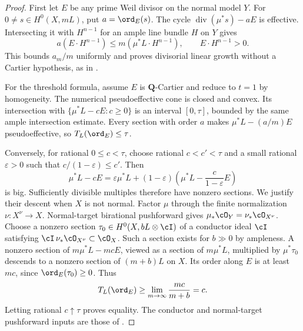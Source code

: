\begin{proof}
First let $E$ be any prime Weil divisor on the normal model $Y$.
For $0\ne s\in H^0(X,mL)$, put $a=\ord_E(s)$.  The cycle
$\operatorname{div}(\mu^*s)-aE$ is effective.  Intersecting it with
$H^{n-1}$ for an ample line bundle $H$ on $Y$ gives
\[
 a(E\cdot H^{n-1})\le m(\mu^*L\cdot H^{n-1}),
 \qquad E\cdot H^{n-1}>0.
\]
This bounds $a_m/m$ uniformly and proves divisorial linear growth
without a Cartier hypothesis, as in \cite[Proposition~1.28]{BJ22}.

For the threshold formula, assume $E$ is $\mathbf Q$-Cartier and
reduce to $t=1$ by homogeneity.  The numerical pseudoeffective cone
is closed and convex.  Its intersection with
$\{\mu^*L-cE:c\ge0\}$ is an interval $[0,\tau]$, bounded by the
same ample intersection estimate.  Every section with order $a$
makes $\mu^*L-(a/m)E$ pseudoeffective, so $T_L(\ord_E)\le\tau$.

Conversely, for rational $0\le c<\tau$, choose rational
$c<c'<\tau$ and a small rational $\varepsilon>0$ such that
$c/(1-\varepsilon)\le c'$.  Then
\[
 \mu^*L-cE=\varepsilon\mu^*L+
 (1-\varepsilon)\left(\mu^*L-\frac{c}{1-\varepsilon}E\right)
\]
is big.  Sufficiently divisible multiples therefore have nonzero
sections.  We justify their descent when $X$ is not normal.
Factor $\mu$ through the finite normalization $\nu:X^\nu\to X$.
Normal-target birational pushforward gives
$\mu_*\cO_Y=\nu_*\cO_{X^\nu}$.  Choose a nonzero section
$\tau_0\in H^0(X,bL\otimes\cI)$ of a conductor ideal
$\cI$ satisfying $\cI\,\nu_*\cO_{X^\nu}\subset\cO_X$.
Such a section exists for $b\gg0$ by ampleness.  A nonzero section
of $m\mu^*L-mcE$, viewed as a section of $m\mu^*L$, multiplied by
$\mu^*\tau_0$ descends to a nonzero section of $(m+b)L$ on $X$.
Its order along $E$ is at least $mc$, since $\ord_E(\tau_0)\ge0$.
Thus
\[
 T_L(\ord_E)\ge\lim_{m\to\infty}\frac{mc}{m+b}=c.
\]
Letting rational $c\uparrow\tau$ proves equality.  The conductor
and normal-target pushforward inputs are those of
.
\end{proof}

